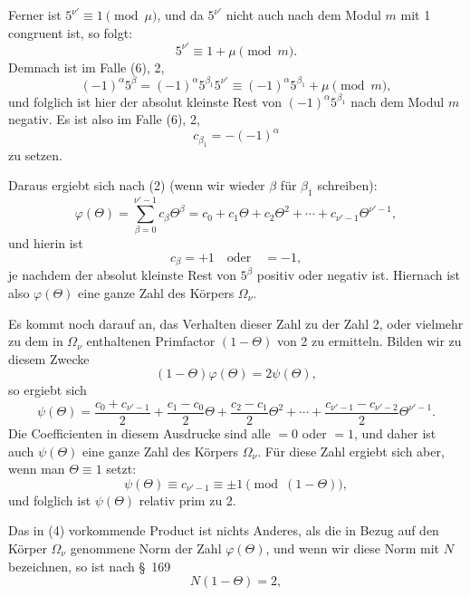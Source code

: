 \documentclass[11pt]{article}
\begin{document}
Ferner ist $5^{\nu'}\equiv1\pmod\mu$, und da $5^{\nu'}$ nicht auch nach dem Modul $m$ mit 1 congruent ist, so folgt:
\begin{equation}
5^{\nu'}\equiv1+\mu\pmod m.
\tag{7}
\end{equation}
Demnach ist im Falle (6), 2,
\[
(-1)^\alpha5^\beta=(-1)^\alpha5^{\beta_1}5^{\nu'}\equiv(-1)^\alpha5^{\beta_1}+\mu\pmod m,
\]
und folglich ist hier der absolut kleinste Rest von $(-1)^\alpha5^{\beta_1}$ nach dem Modul $m$ negativ. Es ist also im Falle (6), 2,
\[
c_{\beta_1}=-(-1)^\alpha
\]
zu setzen.

Daraus ergiebt sich nach (2) (wenn wir wieder $\beta$ für $\beta_1$ schreiben):
\begin{equation}
\varphi(\Theta)=\sum_{\beta=0}^{\nu'-1}c_\beta\Theta^\beta
=c_0+c_1\Theta+c_2\Theta^2+\cdots+c_{\nu'-1}\Theta^{\nu'-1},
\tag{8}
\end{equation}
und hierin ist
\begin{equation}
c_\beta=+1\quad\text{oder}\quad=-1,
\tag{9}
\end{equation}
je nachdem der absolut kleinste Rest von $5^\beta$ positiv oder negativ ist. Hiernach ist also $\varphi(\Theta)$ eine ganze Zahl des Körpers $\Omega_\nu$.

Es kommt noch darauf an, das Verhalten dieser Zahl zu der Zahl 2, oder vielmehr zu dem in $\Omega_\nu$ enthaltenen Primfactor $(1-\Theta)$ von 2 zu ermitteln. Bilden wir zu diesem Zwecke
\begin{equation}
(1-\Theta)\varphi(\Theta)=2\psi(\Theta),
\tag{10}
\end{equation}
so ergiebt sich
\begin{equation}
\psi(\Theta)=\frac{c_0+c_{\nu'-1}}2+\frac{c_1-c_0}2\Theta+\frac{c_2-c_1}2\Theta^2+\cdots+
\frac{c_{\nu'-1}-c_{\nu'-2}}2\Theta^{\nu'-1}.
\tag{11}
\end{equation}
Die Coefficienten in diesem Ausdrucke sind alle $=0$ oder $=1$, und daher ist auch $\psi(\Theta)$ eine ganze Zahl des Körpers $\Omega_\nu$. Für diese Zahl ergiebt sich aber, wenn man $\Theta\equiv1$ setzt:
\begin{equation}
\psi(\Theta)\equiv c_{\nu'-1}\equiv\pm1\pmod{(1-\Theta)},
\tag{12}
\end{equation}
und folglich ist $\psi(\Theta)$ relativ prim zu 2.

Das in (4) vorkommende Product ist nichts Anderes, als die in Bezug auf den Körper $\Omega_\nu$ genommene Norm der Zahl $\varphi(\Theta)$, und wenn wir diese Norm mit $N$ bezeichnen, so ist nach \S~169
\[
N(1-\Theta)=2,
\]
\end{document}
